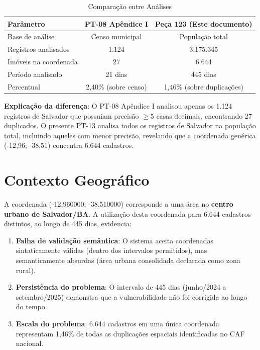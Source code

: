 \documentclass[11pt,a4paper]{article}
\begin{document}
\begin{table}[H]
\centering
\caption{Comparação entre Análises}
\label{tab:comparacao}
\begin{tabular}{lcc}
\toprule
\textbf{Parâmetro} & \textbf{PT-08 Apêndice I} & \textbf{Peça 123 (Este documento)} \\
\midrule
Base de análise & Censo municipal & População total \\
Registros analisados & 1.124 & 3.175.345 \\
\midrule
Imóveis na coordenada & 27 & 6.644 \\
Período analisado & 21 dias & 445 dias \\
Percentual & 2,40\% (sobre censo) & 1,46\% (sobre duplicações) \\
\bottomrule
\end{tabular}
\end{table}

\textbf{Explicação da diferença}: O PT-08 Apêndice I analisou apenas os 1.124 registros
de Salvador que possuíam precisão $\geq$5 casas decimais, encontrando 27 duplicados.
O presente PT-13 analisa todos os registros de Salvador na população total, incluindo
aqueles com menor precisão, revelando que a coordenada genérica (-12,96; -38,51)
concentra 6.644 cadastros.

\section{Contexto Geográfico}

A coordenada (-12,960000; -38,510000) corresponde a uma área no \textbf{centro urbano
de Salvador/BA}. A utilização desta coordenada para 6.644 cadastros distintos,
ao longo de 445 dias, evidencia:

\begin{enumerate}
    \item \textbf{Falha de validação semântica}: O sistema aceita coordenadas
    sintaticamente válidas (dentro dos intervalos permitidos), mas semanticamente
    absurdas (área urbana consolidada declarada como zona rural).

    \item \textbf{Persistência do problema}: O intervalo de 445 dias (junho/2024 a
    setembro/2025) demonstra que a vulnerabilidade não foi corrigida ao longo do tempo.

    \item \textbf{Escala do problema}: 6.644 cadastros em uma única coordenada
    representam 1,46\% de todas as duplicações espaciais identificadas no CAF nacional.
\end{enumerate}
\end{document}
